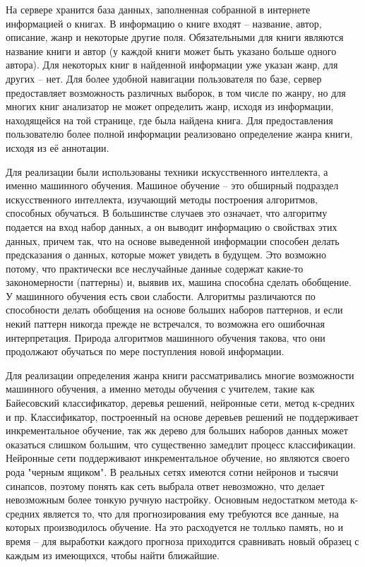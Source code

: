 \documentclass[a4paper]{report}
\begin{document}
На сервере хранится база данных, заполненная собранной в интернете информацией о книгах. В информацию о книге входят -- название, автор, описание, жанр и некоторые другие поля. Обязательными для книги являются название книги и автор (у каждой книги может быть указано больше одного автора). Для некоторых книг в найденной информации уже указан жанр, для других -- нет. Для более удобной навигации пользователя по базе, сервер предоставляет возможность различных выборок, в том числе по жанру, но для многих книг анализатор не может определить жанр, исходя из информации, находящейся на той странице, где была найдена книга. Для предоставления пользователю более полной информации реализовано определение жанра книги, исходя из её аннотации. 

Для реализации были использованы техники искусственного интеллекта, а именно машинного обучения. Машиное обучение -- это обширный подраздел искусственного интеллекта, изучающий методы построения алгоритмов, способных обучаться. В большинстве случаев это означает, что алгоритму подается на вход набор данных, а он выводит информацию о свойствах этих данных, причем так, что на основе выведенной информации способен делать предсказания о данных, которые может увидеть в будущем. Это возможно потому, что практически все неслучайные данные содержат какие-то закономерности (паттерны) и, выявив их, машина способна сделать обобщение. У машинного обучения есть свои слабости. Алгоритмы различаются по способности делать обобщения на основе больших наборов паттернов, и если некий паттерн никогда прежде не встречался, то возможна его ошибочная интерпретация. Природа алгоритмов машинного обучения такова, что они продолжают обучаться по мере поступления новой информации.

Для реализации определения жанра книги рассматривались многие возможности машинного обучения, а именно методы обучения с учителем, такие как Байесовский классификатор, деревья решений, нейронные сети, метод к-средних и пр. Классификатор, построенный на основе деревьев решений не поддерживает инкрементальное обучение, так жк дерево для больших наборов данных может оказаться слишком большим, что существенно замедлит процесс классификации. Нейронные сети поддерживают инкрементальное обучение, но являются своего рода "черным ящиком". В реальных сетях имеются сотни нейронов и тысячи синапсов, поэтому понять как сеть выбрала ответ невозможно, что делает невозможным более тонкую ручную настройку. Основным недостатком метода к-средних является то, что для прогнозирования ему требуются все данные, на которых производилось обучение. На это расходуется не толлько память, но и время -- для выработки каждого прогноза приходится сравнивать новый образец с каждым из имеющихся, чтобы найти ближайшие. 
\end{document}

